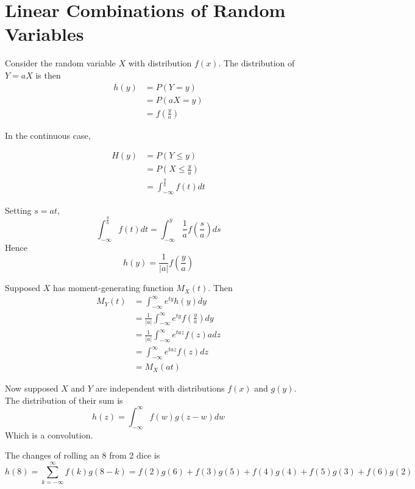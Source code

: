 \documentclass[12pt]{article}
\begin{document}
\section{Linear Combinations of Random Variables}

Consider the random variable $X$ with distribution $f(x)$. The distribution of $Y=aX$ is then
\begin{align*}
	h(y) &= P(Y=y) \\
	     &= P(aX=y) \\
	     &= f\left(\frac{y}{a}\right)
\end{align*}

In the continuous case,

\begin{align*}
	H(y) &= P(Y\leq y) \\
	     &= P(X\leq \frac{y}{a}) \\
	     &= \int_{-\infty}^{\frac{y}{a}}f(t)dt
\end{align*}

Setting $s=at$,
$$\int_{-\infty}^{\frac{y}{a}}f(t)dt = \int_{-\infty}^y \frac{1}{a}f\left(\frac{s}{a}\right)ds$$
Hence
$$h(y) = \frac{1}{|a|}f\left(\frac{y}{a}\right)$$

Supposed $X$ has moment-generating function $M_X(t)$. Then
\begin{align*}
	M_Y(t) &= \int_{-\infty}^\infty e^{ty}h(y)dy \\
	       &= \frac{1}{|a|}\int_{-\infty}^\infty e^{ty}f\left(\frac{y}{a}\right)dy \\
	       &= \frac{1}{|a|} \int_{-\infty}^\infty e^{taz}f(z)adz \\
	       &= \int_{-\infty}^\infty e^{taz}f(z)dz \\
	       &= M_X(at)
\end{align*}

Now supposed $X$ and $Y$ are independent with distributions $f(x)$ and $g(y)$. The distribution of their sum is
$$h(z) = \int_{-\infty}^\infty f(w)g(z-w)dw$$
Which is a convolution.

\begin{ex}
	The changes of rolling an 8 from 2 dice is
	$$h(8) = \sum_{k=-\infty}^\infty f(k)g(8-k) = f(2)g(6) + f(3)g(5) + f(4)g(4) + f(5)g(3) + f(6)g(2)$$
\end{ex}
\end{document}
